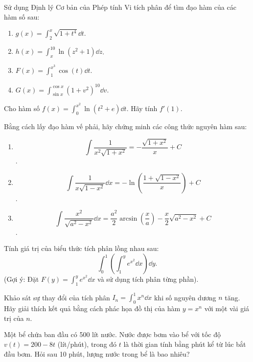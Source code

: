 \begin{exercise}
    Sử dụng Định lý Cơ bản của Phép tính Vi tích phân để tìm đạo hàm của các hàm số sau:
    \begin{enumerate}[label=(\alph*)]
        \item $g(x) = \int_{2}^{x} \sqrt{1+t^4} \dd t$.
        \item $h(x) = \int_{x}^{10} \ln(z^2+1) \dd z$.
        \item $F(x) = \int_{1}^{x^3} \cos(t) \dd t$.
        \item $G(x) = \int_{\sin x}^{\cos x} (1+v^2)^{10} \dd v$.
    \end{enumerate}
\end{exercise}

\begin{exercise}
    Cho hàm số $f(x) = \int_{0}^{x^2} \ln(t^2 + e) \dd t$. Hãy tính $f'(1)$.
\end{exercise}

\begin{exercise}
    Bằng cách lấy đạo hàm vế phải, hãy chứng minh các công thức nguyên hàm sau:
    \begin{enumerate}[label=(\alph*)]
        \item \[\int \dfrac{1}{x^2 \sqrt{1 + x^2}} = - \dfrac{\sqrt{1 + x^2}}{x} + C\]. 
        \item \[\int \frac{1}{x \sqrt{1-x^2}} \dd x = -\ln\left(\frac{1+\sqrt{1-x^2}}{x}\right) + C\].
        \item \[\int \frac{x^2}{\sqrt{a^2-x^2}} \dd x = \frac{a^2}{2}\arcsin\left(\frac{x}{a}\right) - \frac{x}{2}\sqrt{a^2-x^2} + C\].
    \end{enumerate}
\end{exercise}

\begin{exercise}
    Tính giá trị của biểu thức tích phân lồng nhau sau:
    \[ \int_{0}^{1} \left( \int_{1}^{y} e^{x^2} \dd x \right) \dd y. \]
    (Gợi ý: Đặt $F(y) = \int_{1}^{y} e^{x^2} \dd x$ và sử dụng tích phân từng phần).
\end{exercise}

\begin{exercise}
    Khảo sát sự thay đổi của tích phân $I_n = \int_0^1 x^n \dd x$ khi số nguyên dương $n$ tăng. Hãy giải thích kết quả bằng cách phác họa đồ thị của hàm $y=x^n$ với một vài giá trị của $n$.
\end{exercise}

\begin{exercise}
    Một bể chứa ban đầu có 500 lít nước. Nước được bơm vào bể với tốc độ $v(t) = 200 - 8t$ (lít/phút), trong đó $t$ là thời gian tính bằng phút kể từ lúc bắt đầu bơm. Hỏi sau 10 phút, lượng nước trong bể là bao nhiêu?
\end{exercise}

